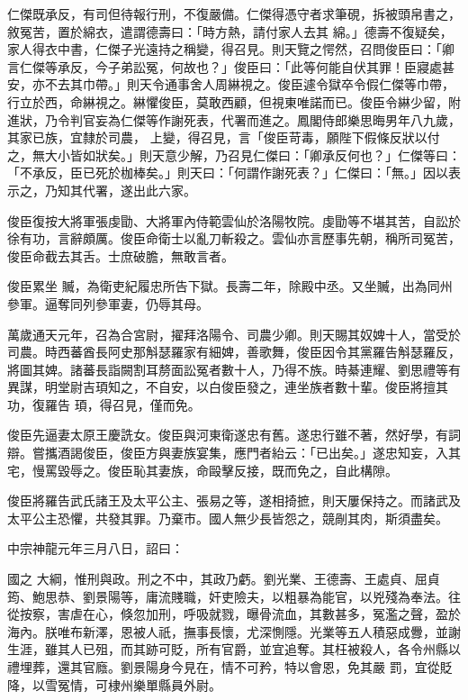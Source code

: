 \begin{pinyinscope}
 仁傑既承反，有司但待報行刑，不復嚴備。仁傑得憑守者求筆硯，拆被頭帛書之，敘冤苦，置於綿衣，遣謂德壽曰：「時方熱，請付家人去其
 綿。」德壽不復疑矣，家人得衣中書，仁傑子光遠持之稱變，得召見。則天覽之愕然，召問俊臣曰：「卿言仁傑等承反，今子弟訟冤，何故也？」俊臣曰：「此等何能自伏其罪！臣寢處甚安，亦不去其巾帶。」則天令通事舍人周綝視之。俊臣遽令獄卒令假仁傑等巾帶，行立於西，命綝視之。綝懼俊臣，莫敢西顧，但視東唯諾而已。俊臣令綝少留，附進狀，乃令判官妄為仁傑等作謝死表，代署而進之。鳳閣侍郎樂思晦男年八九歲，其家已族，宜隸於司農，
 上變，得召見，言「俊臣苛毒，願陛下假條反狀以付之，無大小皆如狀矣。」則天意少解，乃召見仁傑曰：「卿承反何也？」仁傑等曰：「不承反，臣已死於枷棒矣。」則天曰：「何謂作謝死表？」仁傑曰：「無。」因以表示之，乃知其代署，遂出此六家。



 俊臣復按大將軍張虔勖、大將軍內侍範雲仙於洛陽牧院。虔勖等不堪其苦，自訟於徐有功，言辭頗厲。俊臣命衛士以亂刀斬殺之。雲仙亦言歷事先朝，稱所司冤苦，俊臣命截去其舌。士庶破膽，無敢言者。



 俊臣累坐
 贓，為衛吏紀履忠所告下獄。長壽二年，除殿中丞。又坐贓，出為同州參軍。逼奪同列參軍妻，仍辱其母。



 萬歲通天元年，召為合宮尉，擢拜洛陽令、司農少卿。則天賜其奴婢十人，當受於司農。時西蕃酋長阿史那斛瑟羅家有細婢，善歌舞，俊臣因令其黨羅告斛瑟羅反，將圖其婢。諸蕃長詣闕割耳剺面訟冤者數十人，乃得不族。時綦連耀、劉思禮等有異謀，明堂尉吉頊知之，不自安，以白俊臣發之，連坐族者數十輩。俊臣將擅其功，復羅告
 頊，得召見，僅而免。



 俊臣先逼妻太原王慶詵女。俊臣與河東衛遂忠有舊。遂忠行雖不著，然好學，有詞辯。嘗攜酒謁俊臣，俊臣方與妻族宴集，應門者紿云：「已出矣。」遂忠知妄，入其宅，慢罵毀辱之。俊臣恥其妻族，命毆擊反接，既而免之，自此構隙。



 俊臣將羅告武氏諸王及太平公主、張易之等，遂相掎摭，則天屢保持之。而諸武及太平公主恐懼，共發其罪。乃棄市。國人無少長皆怨之，競剮其肉，斯須盡矣。



 中宗神龍元年三月八日，詔曰：



 國之
 大綱，惟刑與政。刑之不中，其政乃虧。劉光業、王德壽、王處貞、屈貞筠、鮑思恭、劉景陽等，庸流賤職，奸吏險夫，以粗暴為能官，以兇殘為奉法。往從按察，害虐在心，倏忽加刑，呼吸就戮，曝骨流血，其數甚多，冤濫之聲，盈於海內。朕唯布新澤，恩被人祇，撫事長懷，尤深惻隱。光業等五人積惡成釁，並謝生涯，雖其人已殂，而其跡可貶，所有官爵，並宜追奪。其枉被殺人，各令州縣以禮埋葬，還其官廕。劉景陽身今見在，情不可矜，特以會恩，免其嚴
 罰，宜從貶降，以雪冤情，可棣州樂單縣員外尉。




\end{pinyinscope}
